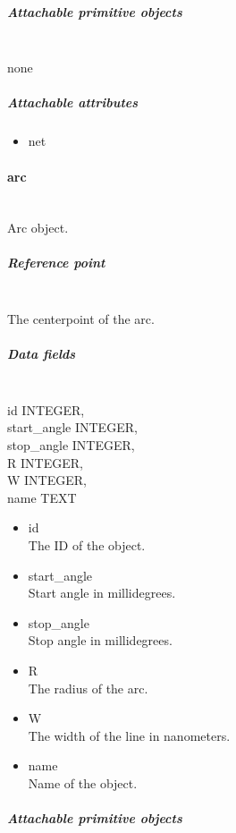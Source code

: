 \documentclass[12pt]{article}
\begin{document}
\subparagraph{Attachable primitive
objects}\label{attachable-primitive-objects}

\mbox{}\\

none

\subparagraph{Attachable attributes}\label{attachable-attributes}

\begin{itemize}
\item
  net
\end{itemize}

\paragraph{arc}\label{arc}

\mbox{}\\

Arc object.

\subparagraph{Reference point}\label{reference-point-1}

\mbox{}\\

The centerpoint of the arc.

\subparagraph{Data fields}\label{data-fields-1}

\mbox{}\\

id INTEGER,\\
start\_angle INTEGER,\\
stop\_angle INTEGER,\\
R INTEGER,\\
W INTEGER,\\
name TEXT

\begin{itemize}
\item
  id\\The ID of the object.
\item start\_angle\\
Start angle in millidegrees.
\item stop\_angle\\
Stop angle in millidegrees.
\item R\\
The radius of the arc.
\item W\\
The width of the line in nanometers.
\item
  name\\Name of the object.
\end{itemize}

\subparagraph{Attachable primitive
objects}\label{attachable-primitive-objects-1}
\end{document}
